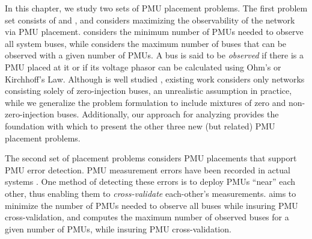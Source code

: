 In this chapter, we study two sets of PMU placement problems.  The first problem set consists of \full and \maxincs, and considers maximizing the observability of the network via PMU placement. \full considers the minimum number of PMUs needed 
to observe all system buses, while \maxinc considers the maximum number of buses that can be observed with a given number of PMUs. 
A bus is said to be {\em observed} if there is a PMU placed at it or if
its voltage phasor can be calculated using Ohm's or Kirchhoff's Law.  Although \full is well studied \cite{Baldwin93,Brueni05,Haynes02,Mili90,Xu04}, existing work considers only networks consisting solely of zero-injection buses, 
an unrealistic assumption in practice,
while we generalize the problem formulation to include mixtures of zero and  non-zero-injection buses. Additionally, our approach for analyzing \full provides the foundation with which to present the other three new (but related) PMU placement problems.

The second set of placement problems considers PMU placements that support PMU error detection. PMU measurement errors have been recorded in actual systems \cite{Vanfretti10}. 
One method of detecting these errors is to deploy PMUs ``near'' each other, thus enabling them to {\em cross-validate} each-other's measurements. 
{\xvals} aims to minimize the number of PMUs needed to observe all buses while insuring PMU cross-validation, and {\xvalparts} computes the maximum number of observed buses for a given number of PMUs, while insuring PMU cross-validation.



